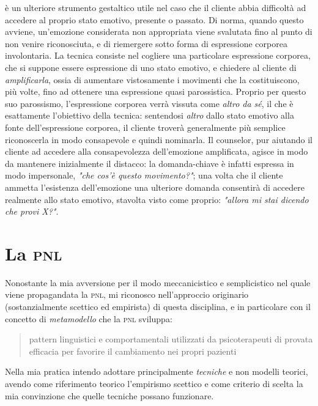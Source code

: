  è un ulteriore strumento gestaltico utile nel caso che il cliente abbia difficoltà ad accedere al proprio stato emotivo, presente o passato. Di norma, quando questo avviene, un'emozione considerata non appropriata viene svalutata fino al punto di non venire riconosciuta, e di riemergere sotto forma di espressione corporea involontaria.
La tecnica consiste nel cogliere una particolare espressione corporea, che si suppone essere espressione di uno stato emotivo, e chiedere al cliente di \emph{amplificarla}, ossia di aumentare vistosamente i movimenti che la costituiscono, più volte, fino ad ottenere una espressione quasi parossistica. Proprio per questo suo parossismo, l'espressione corporea verrà vissuta come \emph{altro da sé}, il che è esattamente l'obiettivo della tecnica: sentendosi \emph{altro} dallo stato emotivo alla fonte dell'espressione corporea, il cliente troverà generalmente più semplice riconoscerla in modo consapevole e quindi nominarla. Il counselor, pur aiutando il cliente ad accedere alla consapevolezza dell'emozione amplificata, agisce in modo da mantenere inizialmente il distacco: la domanda-chiave è infatti espressa in modo impersonale, \emph{"che cos'è questo movimento?"}; una volta che il cliente ammetta l'esistenza dell'emozione una ulteriore domanda consentirà di accedere realmente allo stato emotivo, stavolta visto come proprio: \emph{"allora mi stai dicendo che provi X?"}.

\section{La \textsc{pnl}}
\label{sec:pnl}
Nonostante la mia avversione per il modo meccanicistico e semplicistico nel quale viene propagandata la \textsc{pnl}, mi riconosco nell'approccio originario (sostanzialmente scettico ed empirista)  di questa disciplina, e in particolare con il concetto di \textit{metamodello} che la \textsc{pnl} sviluppa: \begin{quote}
pattern linguistici e comportamentali utilizzati da psicoterapeuti di provata efficacia per favorire il cambiamento nei propri pazienti\cite{magic} 
\end{quote}

\noindent Nella mia pratica intendo adottare principalmente \emph{tecniche} e non modelli teorici, avendo come riferimento teorico l'empirismo scettico e come criterio di scelta la mia convinzione che quelle tecniche possano funzionare.

